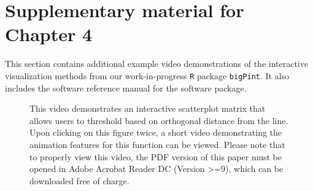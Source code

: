 \documentclass[11pt,a4paper,oldfontcommands,openany]{memoir}
\numberwithin{equation}{section} %
\newcommand{\pkg}[1]{{\texttt{#1}}}
\begin{document}

\chapter{Supplementary material for Chapter 4}
\label{sec:suppchapter3}

This section contains additional example video demonstrations of the interactive visualization methods from our work-in-progress \pkg{R} package \pkg{bigPint}. It also includes the software reference manual for the software package.

\begin{figure}[H]
    \begin{framed}
    \centering
    \end{framed}
    \caption{This video demonstrates an interactive scatterplot matrix that allows users to threshold based on orthogonal distance from the  line. Upon clicking on this figure twice, a short video demonstrating the animation features for this function can be viewed. Please note that to properly view this video, the PDF version of this paper must be opened in Adobe Acrobat Reader DC (Version >=9), which can be downloaded free of charge.}
    \label{fig:scatMatOrth}
\end{figure}
\end{document}
